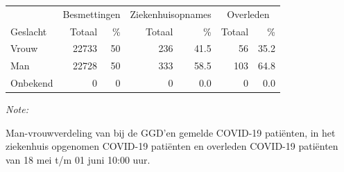 \documentclass[
  english,
  man,floatsintext]{apa6}
\begin{document}
\begin{table}
\centering\begingroup\fontsize{11}{13}\selectfont

\begin{threeparttable}
\begin{tabular}{lrrrrrr}
\toprule
\multicolumn{1}{c}{ } & \multicolumn{2}{c}{Besmettingen} & \multicolumn{2}{c}{Ziekenhuisopnames} & \multicolumn{2}{c}{Overleden} \\
\cmidrule(l{3pt}r{3pt}){2-3} \cmidrule(l{3pt}r{3pt}){4-5} \cmidrule(l{3pt}r{3pt}){6-7}
Geslacht & Totaal & \% & Totaal & \% & Totaal & \%\\
\midrule
Vrouw & 22733 & 50 & 236 & 41.5 & 56 & 35.2\\
Man & 22728 & 50 & 333 & 58.5 & 103 & 64.8\\
Onbekend & 0 & 0 & 0 & 0.0 & 0 & 0.0\\
\bottomrule
\end{tabular}
\begin{tablenotes}
\item \textit{Note: } 
\item Man-vrouwverdeling van bij de GGD’en gemelde COVID-19 patiënten, in het ziekenhuis opgenomen COVID-19 patiënten en overleden COVID-19 patiënten van 18 mei t/m 01 juni 10:00 uur.
\end{tablenotes}
\end{threeparttable}
\endgroup{}
\end{table}
\newpage
\end{document}
